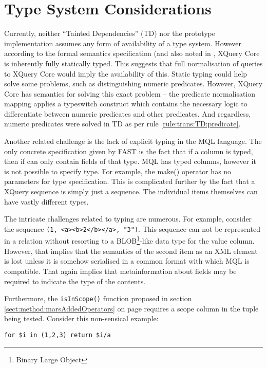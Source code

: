 \section{Type System Considerations}
\label{sect:disc:typeSystem}
Currently, neither ``Tainted Dependencies'' (TD) nor the prototype
implementation assumes any form of availability of a type system. However
according to the formal semantics specification\cite{xquery_semantics} (and
also noted in \cite{pathfinder_compiling_xquery}, XQuery Core is inherently
fully statically typed. This suggests that full normalisation of queries to
XQuery Core would imply the availability of this. Static typing could help
solve some problems, such as distinguishing numeric predicates. However, XQuery
Core has semantics for solving this exact problem -- the predicate normalisation
mapping applies a typeswitch construct which contains the necessary logic to
differentiate between numeric predicates and other predicates. And regardless,
numeric predicates were solved in TD as per rule \ref{rule:trans:TD:predicate}.

Another related challenge is the lack of explicit typing in the MQL language.
The only concrete specification given by FAST is the fact that if a column is
typed, then if can only contain fields of that type. MQL has typed columns,
however it is not possible to specify type. For example, the \textsf{make()}
operator has no parameters for type specification. This is complicated further
by the fact that a XQuery sequence is simply just a sequence. The individual
items themselves can have vastly different types.

The intricate challenges related to typing are numerous. For example, consider
the sequence \texttt{(1, <a><b>2</b></a>, "3")}. This sequence can not be
represented in a relation without resorting to a BLOB\footnote{Binary
Large Object}-like data type for the value column. However, that implies that
the semantics of the second item as an XML element is lost unless it is somehow
serialised in a common format with which MQL is compatible. That again implies
that metainformation about fields may be required to indicate the type of the
contents.

Furthermore, the \texttt{isInScope()} function proposed in section
\ref{sect:method:marsAddedOperators} on page
\pageref{sect:method:marsAddedOperators} requires a scope column in the tuple
being tested. Consider this non-sensical example:

\begin{Verbatim}
for $i in (1,2,3) return $i/a
\end{Verbatim}

